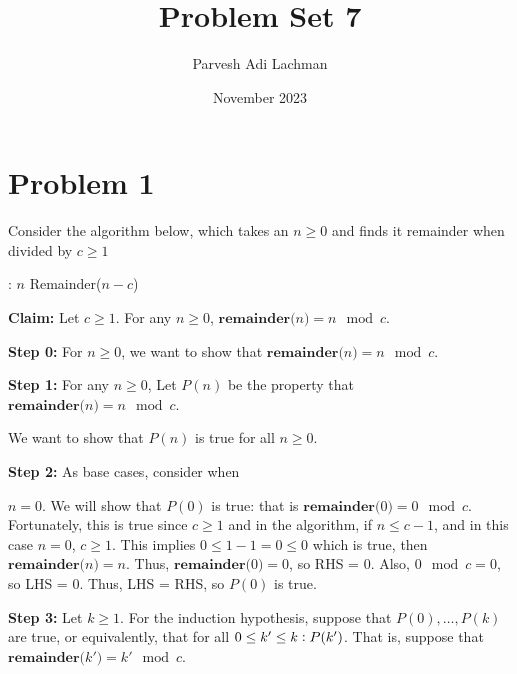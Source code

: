 \documentclass{article}
\title{Problem Set 7}
\author{Parvesh Adi Lachman}
\date{November 2023}
\begin{document}
\maketitle
\section{Problem 1}

Consider the algorithm below, which takes an $n\geq 0$ and finds it remainder when divided by $c\geq 1$

\vspace{15pt}

\begin{algorithmic}
:
\State \Return $n$
\Else
\State \Return Remainder($n-c$)
\EndIf
\EndFunction
\end{algorithmic}

\vspace{10pt}


\noindent\textbf{Claim:} Let $c\geq 1$. For any $n\geq 0$, $\textbf{remainder($n$)}=n\mod c$.
\vspace{10pt}


\textbf{Step 0:} For $n\geq 0$, we want to show that $\textbf{remainder($n$)}=n\mod c$. 
\vspace{15pt}

\textbf{Step 1:} For any $n\geq 0$, Let $P(n)$ be the property that $\textbf{remainder($n$)}=n\mod c$.

\vspace{5pt}
We want to show that $P(n)$ is true for all $n\geq 0$.


\vspace{15pt}

\textbf{Step 2:} As base cases, consider when\vspace{10pt}


$n=0$. We will show that $P(0)$ is true: that is $\textbf{remainder($0$)}=0\mod c$. Fortunately, this is true since $c\geq 1$ and in the algorithm, if $n\leq c-1$, and in this case $n=0$, $c\geq1$. This implies $0\leq 1-1=0\leq0$ which is true, then $\textbf{remainder($n$)}=n$. Thus, $\textbf{remainder($0$)}=0$, so RHS = 0. Also, $0\mod c=0$, so LHS = 0. Thus, LHS = RHS, so $P(0)$ is true.
\vspace{10pt}


\vspace{15pt}
\pagebreak
\textbf{Step 3:} Let $k\geq 1$. For the induction hypothesis, suppose that $P(0),\ldots,P(k)$ are true, or equivalently, that for all $0\leq k'\leq k\vcentcolon P(k')$. That is, suppose that $\textbf{remainder($k'$)}=k'\mod c$.
\vspace{15pt}
\end{document}
